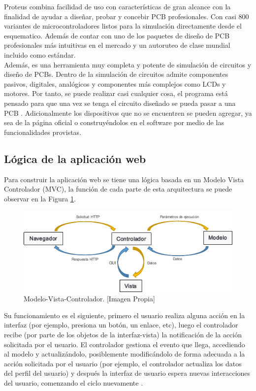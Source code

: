 Proteus combina facilidad de uso con características de gran alcance con la finalidad de ayudar a diseñar, probar y concebir PCB profesionales. Con casi 800 variantes de microcontroladores listos para la simulación directamente desde el esquematico. Además de contar con uno de los paquetes de diseño de PCB profesionales más intuitivas en el mercado y un autoruteo de clase mundial incluido como estándar. \cite{Prot1} \\

Además, es una herramienta muy completa y potente de simulación de circuitos y diseño de PCBs. Dentro de la simulación de circuitos admite componentes pasivos, digitales, analógicos y componentes más complejos como LCDs y motores. Por tanto, se puede realizar casi cualquier cosa, el programa está pensado para que una vez se tenga el circuito diseñado se pueda pasar a una PCB \cite{Prot2}. Adicionalmente los dispositivos que no se encuentren se pueden agregar, ya sea de la página oficial o construyéndolos en el software por medio de las funcionalidades provistas.

\subsection{Lógica de la aplicación web}

Para construir la aplicación web se tiene una lógica basada en un Modelo Vista Controlador (MVC), la función de cada parte de esta arquitectura se puede observar en la Figura \ref{fig:mvc}.\\

\begin{figure}[H]
	\centering
	\caption[Modelo-Vista-Controlador.]{Modelo-Vista-Controlador. [Imagen Propia]}
	\label{fig:mvc}
	\includegraphics[width=0.7\linewidth]{Imagenes/MVC}
\end{figure}

Su funcionamiento es el siguiente, primero el usuario realiza alguna acción en la interfaz (por ejemplo, presiona un botón, un enlace, etc), luego el controlador recibe (por parte de los objetos de la interfaz-vista) la notificación de la acción solicitada por el usuario. El controlador gestiona el evento que llega, accediendo al modelo y actualizándolo, posiblemente modificándolo de forma adecuada a la acción solicitada por el usuario (por ejemplo, el controlador actualiza los datos del perfil del usuario) y después la interfaz de usuario espera nuevas interacciones del usuario, comenzando el ciclo nuevamente \cite{MVC2}.\\

